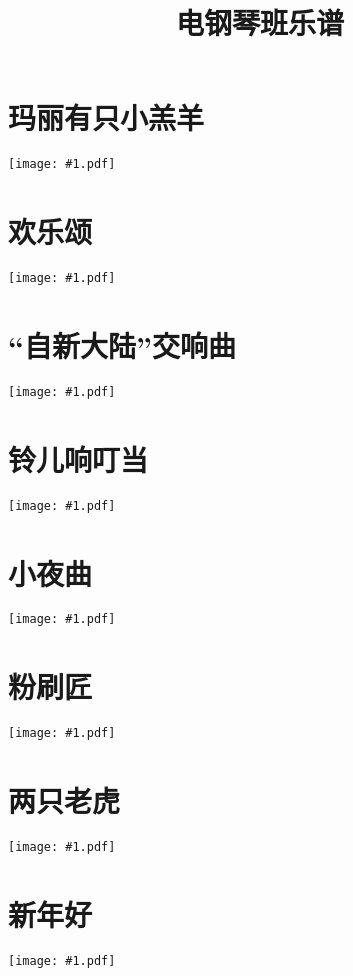 \documentclass[a4paper,12pt,fontset=none]{ctexart}
\title{\bfseries 电钢琴班乐谱}
\author{}
\date{}
\newcommand{\includescore}[1]{\begin{center}\texttt{[image: \#1.pdf]}\end{center}}
\begin{document}
\pagestyle{plain}

\maketitle

\thispagestyle{plain}

\section{玛丽有只小羔羊}
\includescore{mary-had-a-little-lamb}

\section{欢乐颂}
\includescore{ode-to-joy}

\section{“自新大陆”交响曲}
\includescore{from-the-new-world}

\section{铃儿响叮当}
\includescore{jingle-bells}

\section{小夜曲}
\includescore{serenade}

\section{粉刷匠}
\includescore{painter}

\section{两只老虎}
\includescore{two-tigers}

\section{新年好}
\includescore{happy-new-year}
\end{document}
